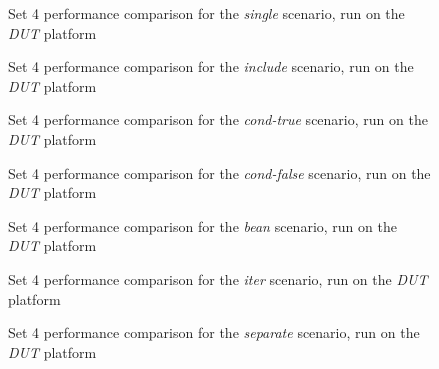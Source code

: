 \begin{figure}[!p]
\centering

\caption{\label{results:set4-dut-single}Set 4 performance comparison for the \emph{single} scenario, run on the \emph{DUT} platform}
\end{figure}

\begin{figure}[!p]
\centering

\caption{\label{results:set4-dut-include}Set 4 performance comparison for the \emph{include} scenario, run on the \emph{DUT} platform}
\end{figure}

\begin{figure}[!p]
\centering

\caption{\label{results:set4-dut-cond-true}Set 4 performance comparison for the \emph{cond-true} scenario, run on the \emph{DUT} platform}
\end{figure}

\begin{figure}[!p]
\centering

\caption{\label{results:set4-dut-cond-false}Set 4 performance comparison for the \emph{cond-false} scenario, run on the \emph{DUT} platform}
\end{figure}

\begin{figure}[!p]
\centering

\caption{\label{results:set4-dut-bean}Set 4 performance comparison for the \emph{bean} scenario, run on the \emph{DUT} platform}
\end{figure}

\begin{figure}[!p]
\centering

\caption{\label{results:set4-dut-iter}Set 4 performance comparison for the \emph{iter} scenario, run on the \emph{DUT} platform}
\end{figure}

\begin{figure}[!p]
\centering

\caption{\label{results:set4-dut-separate}Set 4 performance comparison for the \emph{separate} scenario, run on the \emph{DUT} platform}
\end{figure}

